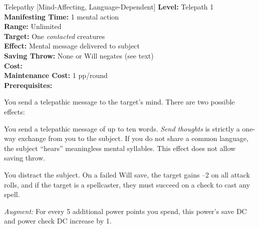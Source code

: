 {Telepathy [Mind-Affecting, Language-Dependent]}
{
	\textbf{Level:}
	Telepath 1\\
	\textbf{Manifesting Time:}
	1 mental action\\
	\textbf{Range:}
	Unlimited\\
	\textbf{Target:}
	One \emph{contacted} creatures\\
	\textbf{Effect:}
	Mental message delivered to subject\\
	\textbf{Saving Throw:}
	None or Will negates (see text)\\
	\textbf{Cost:}
	\\
	\textbf{Maintenance Cost:}
	1 pp/round\\
	\textbf{Prerequisites:}
	\\
}
{
	You send a telepathic message to the target's mind. There are two possible effects:
	\begin{itemize*}
		\item You send a telepathic message of up to ten words. \emph{Send thoughts} is strictly a one-way exchange from you to the subject. If you do not share a common language, the subject ``hears'' meaningless mental syllables. This effect does not allow saving throw.
		\item You distract the subject. On a failed Will save, the target gains --2 on all attack rolls, and if the target is a spellcaster, they must succeed on a  check to cast any spell.
	\end{itemize*}

	\textit{Augment:} For every 5 additional power points you spend, this power's save DC and power check DC increase by 1.
}
